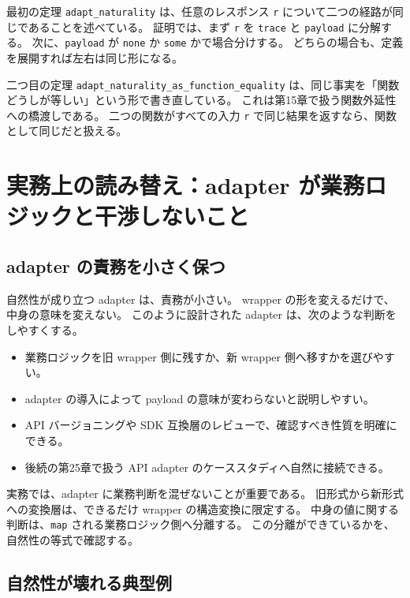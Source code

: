 最初の定理 \texttt{adapt\_naturality} は、任意のレスポンス \texttt{r} について二つの経路が同じであることを述べている。
証明では、まず \texttt{r} を \texttt{trace} と \texttt{payload} に分解する。
次に、\texttt{payload} が \texttt{none} か \texttt{some} かで場合分けする。
どちらの場合も、定義を展開すれば左右は同じ形になる。

二つ目の定理 \texttt{adapt\_naturality\_as\_function\_equality} は、同じ事実を「関数どうしが等しい」という形で書き直している。
これは第15章で扱う関数外延性への橋渡しである。
二つの関数がすべての入力 \texttt{r} で同じ結果を返すなら、関数として同じだと扱える。

\section{実務上の読み替え：adapter が業務ロジックと干渉しないこと}

\subsection{adapter の責務を小さく保つ}

自然性が成り立つ adapter は、責務が小さい。
wrapper の形を変えるだけで、中身の意味を変えない。
このように設計された adapter は、次のような判断をしやすくする。

\begin{itemize}
\item 業務ロジックを旧 wrapper 側に残すか、新 wrapper 側へ移すかを選びやすい。
\item adapter の導入によって payload の意味が変わらないと説明しやすい。
\item API バージョニングや SDK 互換層のレビューで、確認すべき性質を明確にできる。
\item 後続の第25章で扱う API adapter のケーススタディへ自然に接続できる。
\end{itemize}

\begin{softwarebox}
実務では、adapter に業務判断を混ぜないことが重要である。
旧形式から新形式への変換層は、できるだけ wrapper の構造変換に限定する。
中身の値に関する判断は、\texttt{map} される業務ロジック側へ分離する。
この分離ができているかを、自然性の等式で確認する。
\end{softwarebox}

\subsection{自然性が壊れる典型例}

